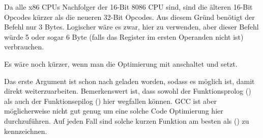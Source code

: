 Da alle x86 CPUs Nachfolger der 16-Bit 8086 CPU sind, sind die älteren 16-Bit
Opcodes kürzer als die neueren 32-Bit Opcodes.
Aus diesem Gründ benötigt der Befehl  nur 3 Bytes. Logischer
wäre es zwar, hier  zu verwenden, aber dieser Befehl würde 5
oder sogar 6 Byte (falls das Register im ersten Operanden nicht \EAX ist)
verbrauchen.

Es wäre noch kürzer, wenn man die Optimierung mit \Othree anschaltet und
 setzt.



Das erste Argument ist schon nach \EAX geladen worden, sodass es möglich ist,
damit direkt weiterzuarbeiten. Bemerkenswert ist, dass sowohl der
Funktionsprolog () als auch der Funktionsepilog
() hier wegfallen können. GCC ist aber möglicherweise nicht gut
genug um eine solche Code Optimierung hier durchzuführen. Auf jeden Fall sind
solche kurzen Funktion am besten als 
() zu kennzeichnen.
